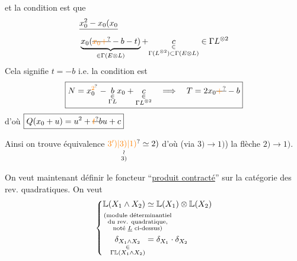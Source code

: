 et la condition est que
\[
\begin{aligned}&\deleted{x_0^2-x_0(x_0}\\&\underbrace{x_0(\deleted{\unsure{x_0+}}-b-t)}_{\in\Gamma(E\otimes L)}+\underset{\substack{\in\\\Gamma(L^{\otimes2})\subset\Gamma(E\otimes L)}}c\in\Gamma L^{\otimes2}\end{aligned}
\]
Cela signifie $\boxed{t=-b}$ i.e. la condition est 
\[
\boxed{N=x_0^{\unsure{2}}-\underset{\substack{\in\\\Gamma L}}b x_0+\underset{\substack{\in\\\Gamma L^{\otimes2}}}c\quad\Longrightarrow\quad T=2x_0\deleted{\unsure{+}}-b}
\]
d'où $\boxed{Q(x_0+u)=u^2+\deleted{\unsure{t}}bu+c}$

Ainsi on trouve équivalence $\underset{\substack{\wr\\3)}}{\unsure{3')|3)|1)}}\simeq2)$ d'où  (via $3)\longrightarrow1)$) la flèche $2)\longrightarrow1)$.

On veut maintenant définir le foncteur ``\uline{produit contracté}'' sur la catégorie des rev. quadratiques. On veut
\[
\left\{\begin{aligned}\mathbb L(X_1\wedge X_2)&\simeq\mathbb L(X_1)\otimes\mathbb L(X_2)\\ &\hspace{-5em}\substack{\text{(module déterminantiel}\\\text{du rev. quadratique,}\\\text{noté }\underline L\text{ ci-dessus)}}\\ \underset{\substack{\in\\\Gamma\mathbb L(X_1\wedge X_2)}}{\delta_{X_1\wedge X_2}}&=\delta_{X_1}\cdot\delta_{X_2}\end{aligned}\right.
\]

